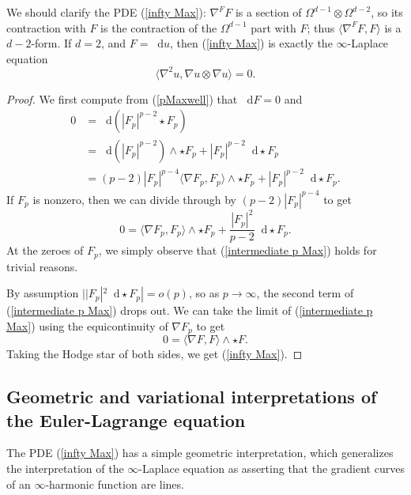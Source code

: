 \documentclass[reqno,11pt]{amsart}
\newcommand*\dif{\mathop{}\!\mathrm{d}}
\theoremstyle{definition}
\numberwithin{equation}{section}
\begin{document}
We should clarify the PDE (\ref{infty Max}): $\nabla^F F$ is a section of $\Omega^{d - 1} \otimes \Omega^{d - 2}$, so its contraction with $F$ is the contraction of the $\Omega^{d - 1}$ part with $F$; thus $\langle \nabla^F F, F\rangle$ is a $d - 2$-form.
If $d = 2$, and $F = \dif u$, then (\ref{infty Max}) is exactly the $\infty$-Laplace equation 
$$\langle\nabla^2 u, \nabla u \otimes \nabla u\rangle = 0.$$

\begin{proof}
We first compute from (\ref{pMaxwell}) that $\dif F = 0$ and
\begin{align*}
0
&= \dif(|F_p|^{p - 2} \star F_p) \\
&= \dif(|F_p|^{p - 2}) \wedge \star F_p + |F_p|^{p - 2} \dif \star F_p \\
&= (p - 2) |F_p|^{p - 4} \langle \nabla F_p, F_p\rangle \wedge \star F_p + |F_p|^{p - 2} \dif \star F_p.
\end{align*}
If $F_p$ is nonzero, then we can divide through by $(p - 2) |F_p|^{p - 4}$ to get
\begin{equation}\label{intermediate p Max}
0 = \langle\nabla F_p, F_p\rangle \wedge \star F_p + \frac{|F_p|^2}{p - 2} \dif \star F_p.
\end{equation}
At the zeroes of $F_p$, we simply observe that (\ref{intermediate p Max}) holds for trivial reasons.

By assumption $||F_p|^2 \dif \star F_p| = o(p)$, so as $p \to \infty$, the second term of (\ref{intermediate p Max}) drops out.
We can take the limit of (\ref{intermediate p Max}) using the equicontinuity of $\nabla F_p$ to get
$$0 = \langle \nabla F, F \rangle \wedge \star F.$$
Taking the Hodge star of both sides, we get (\ref{infty Max}).
\end{proof}

\subsection{Geometric and variational interpretations of the Euler-Lagrange equation}\label{EL interpretation}
The PDE (\ref{infty Max}) has a simple geometric interpretation, which generalizes the interpretation of the $\infty$-Laplace equation as asserting that the gradient curves of an $\infty$-harmonic function are lines.
\end{document}
